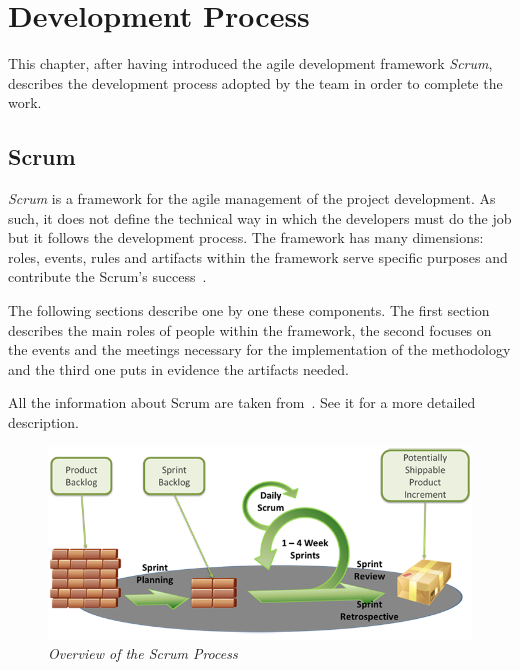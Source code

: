 \chapter{Development Process}\label{devProcChap}
This chapter, after having introduced the agile development framework \emph{Scrum}, describes the development process adopted by the team in order to complete the work.

	\section{Scrum}\label{ref_scrum}
	\emph{Scrum} is a framework for the agile management of the project development. 
	As such, it does not define the technical way in which the developers must do the job but it follows the development process. 	
	The framework has many dimensions: roles, events, rules and artifacts within the framework serve specific purposes and contribute the Scrum's success~\cite{scrumEnglishGuide}.  

	The following sections describe one by one these components. The first section describes the main roles of people within the framework, the second focuses on the events and the meetings necessary for the implementation of the methodology and the third one puts in evidence the artifacts needed.

	All the information about Scrum are taken from~\cite{scrumEnglishGuide}. See it for a more detailed description.

	\begin{figure}[h]
	  \begin{center} 
	    \includegraphics[scale=0.45]{images/ch_04/scrum_overview.png}
	  \end{center} 
	  \caption{\textit{Overview of the Scrum Process}}  
	  \label{fig:ScrumOverview}
  	\end{figure}

